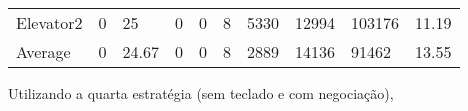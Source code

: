 \documentclass[a4paper]{article}
\begin{document}
\begin{table}[h]
\begin{tabular}{@{}llllllllll@{}}
Elevator2 & 0        & 25            & 0           & 0                                                               & 8                                                                  & 5330                                                         & 12994                                                 & 103176                                                   & 11.19         \\
Average   & 0     & 24.67         & 0        & 0                                                               & 8                                                              & 2889                                                         & 14136                                                 &  91462                                                  & 13.55         \\ \bottomrule
\end{tabular}
\end{table}

\newpage

Utilizando a quarta estratégia (sem teclado e com negociação),
\end{document}
